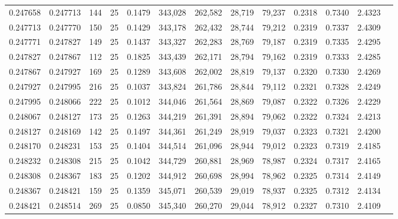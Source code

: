 \begin{tabular}{rrrrrrrrrrrrr}
0.247658 & 0.247713 &   144 &  25 &                                     0.1479 & 343,028 & 262,582 &  28,719 &  79,237 & 0.2318 & 0.7340 & 2.4323 \\
0.247713 & 0.247770 &   150 &  25 &                                     0.1429 & 343,178 & 262,432 &  28,744 &  79,212 & 0.2319 & 0.7337 & 2.4309 \\
0.247771 & 0.247827 &   149 &  25 &                                     0.1437 & 343,327 & 262,283 &  28,769 &  79,187 & 0.2319 & 0.7335 & 2.4295 \\
0.247827 & 0.247867 &   112 &  25 &                                     0.1825 & 343,439 & 262,171 &  28,794 &  79,162 & 0.2319 & 0.7333 & 2.4285 \\
0.247867 & 0.247927 &   169 &  25 &                                     0.1289 & 343,608 & 262,002 &  28,819 &  79,137 & 0.2320 & 0.7330 & 2.4269 \\
0.247927 & 0.247995 &   216 &  25 &                                     0.1037 & 343,824 & 261,786 &  28,844 &  79,112 & 0.2321 & 0.7328 & 2.4249 \\
0.247995 & 0.248066 &   222 &  25 &                                     0.1012 & 344,046 & 261,564 &  28,869 &  79,087 & 0.2322 & 0.7326 & 2.4229 \\
0.248067 & 0.248127 &   173 &  25 &                                     0.1263 & 344,219 & 261,391 &  28,894 &  79,062 & 0.2322 & 0.7324 & 2.4213 \\
0.248127 & 0.248169 &   142 &  25 &                                     0.1497 & 344,361 & 261,249 &  28,919 &  79,037 & 0.2323 & 0.7321 & 2.4200 \\
0.248170 & 0.248231 &   153 &  25 &                                     0.1404 & 344,514 & 261,096 &  28,944 &  79,012 & 0.2323 & 0.7319 & 2.4185 \\
0.248232 & 0.248308 &   215 &  25 &                                     0.1042 & 344,729 & 260,881 &  28,969 &  78,987 & 0.2324 & 0.7317 & 2.4165 \\
0.248308 & 0.248367 &   183 &  25 &                                     0.1202 & 344,912 & 260,698 &  28,994 &  78,962 & 0.2325 & 0.7314 & 2.4149 \\
0.248367 & 0.248421 &   159 &  25 &                                     0.1359 & 345,071 & 260,539 &  29,019 &  78,937 & 0.2325 & 0.7312 & 2.4134 \\
0.248421 & 0.248514 &   269 &  25 &                                     0.0850 & 345,340 & 260,270 &  29,044 &  78,912 & 0.2327 & 0.7310 & 2.4109 \\

\end{tabular}
